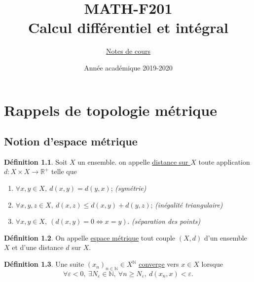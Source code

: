 \documentclass{report}
\title{
    MATH-F201 \\
    Calcul différentiel et intégral \RNum{2}
}
\author{
    \underline{Notes de cours}
}
\date{
    Année académique 2019-2020
}
\newcommand{\Nepsilon}{N_\varepsilon}
\newcommand{\reels}{\mathbb{R}}
\newcommand{\naturals}{\mathbb{N}}
\theoremstyle{definition}
\newtheorem{definition}{Définition}
\theoremstyle{plain}
\theoremstyle{remark}
\begin{document}
\maketitle

\chapter{Rappels de topologie métrique}
\section{Notion d'espace métrique}

\begin{leftbar}
    \begin{definition}
        Soit $X$ un ensemble. on appelle \underline{distance sur $X$} toute
        application $d : X \times X \to \reels^+$ telle que
        \begin{enumerate}
            \item{$\forall x, y \in X,\ d(x, y) = d(y, x)$;\hfill
                \textit{(symétrie)}}
            \item{$\forall x, y, z \in X,\ d(x, z) \le d(x, y) + d(y, z)$;
                \hfill\textit{(inégalité triangulaire)}}
            \item{$\forall x, y \in X,\ (d(x, y) = 0 \iff x = y)$.\hfill
                \textit{(séparation des points)}}
        \end{enumerate}
    \end{definition}
\end{leftbar}

\begin{leftbar}
    \begin{definition}
        On appelle \underline{espace métrique} tout couple $(X, d)$ d'un
        ensemble $X$ et d'une distance $d$ sur $X$.
    \end{definition}
\end{leftbar}

\begin{leftbar}
    \begin{definition}
        Une suite $(x_n)_{n\in\naturals} \in X^\naturals$ \underline{converge}
        vers $x \in X$ lorsque \\
        \begin{equation*}
            \forall \varepsilon < 0,\ \exists\Nepsilon\in\naturals,\ 
            \forall n \ge\Nepsilon,\ d(x_n, x) < \varepsilon.
        \end{equation*}
    \end{definition}
\end{leftbar}
\end{document}
